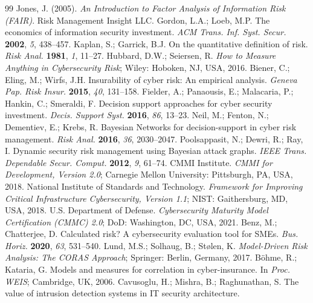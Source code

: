 \documentclass[conference]{IEEEtran}
\begin{document}
\begin{thebibliography}{99}
  Jones, J. (2005).
  \textit{An Introduction to Factor Analysis of Information Risk (FAIR)}.
  Risk Management Insight LLC.
  Gordon, L.A.; Loeb, M.P.
  The economics of information security investment.
  \textit{ACM Trans. Inf. Syst. Secur.} \textbf{2002}, \textit{5}, 438--457.
  Kaplan, S.; Garrick, B.J.
  On the quantitative definition of risk.
  \textit{Risk Anal.} \textbf{1981}, \textit{1}, 11--27.
  Hubbard, D.W.; Seiersen, R.
  \textit{How to Measure Anything in Cybersecurity Risk};
  Wiley: Hoboken, NJ, USA, 2016.
  Biener, C.; Eling, M.; Wirfs, J.H.
  Insurability of cyber risk: An empirical analysis.
  \textit{Geneva Pap. Risk Insur.} \textbf{2015}, \textit{40}, 131--158.
  Fielder, A.; Panaousis, E.; Malacaria, P.; Hankin, C.; Smeraldi, F.
  Decision support approaches for cyber security investment.
  \textit{Decis. Support Syst.} \textbf{2016}, \textit{86}, 13--23.
  Neil, M.; Fenton, N.; Dementiev, E.; Krebs, R.
  Bayesian Networks for decision-support in cyber risk management.
  \textit{Risk Anal.} \textbf{2016}, \textit{36}, 2030--2047.
  Poolsappasit, N.; Dewri, R.; Ray, I.
  Dynamic security risk management using Bayesian attack graphs.
  \textit{IEEE Trans. Dependable Secur. Comput.} \textbf{2012}, \textit{9}, 61--74.
  CMMI Institute.
  \textit{CMMI for Development, Version 2.0};
  Carnegie Mellon University: Pittsburgh, PA, USA, 2018.
  National Institute of Standards and Technology.
  \textit{Framework for Improving Critical Infrastructure Cybersecurity, Version 1.1};
  NIST: Gaithersburg, MD, USA, 2018.
  U.S. Department of Defense.
  \textit{Cybersecurity Maturity Model Certification (CMMC) 2.0};
  DoD: Washington, DC, USA, 2021.
  Benz, M.; Chatterjee, D.
  Calculated risk? A cybersecurity evaluation tool for SMEs.
  \textit{Bus. Horiz.} \textbf{2020}, \textit{63}, 531--540.
  Lund, M.S.; Solhaug, B.; St{\o}len, K.
  \textit{Model-Driven Risk Analysis: The CORAS Approach};
  Springer: Berlin, Germany, 2017.
  B{\"o}hme, R.; Kataria, G.
  Models and measures for correlation in cyber-insurance.
  In \textit{Proc. WEIS}; Cambridge, UK, 2006.
  Cavusoglu, H.; Mishra, B.; Raghunathan, S.
  The value of intrusion detection systems in IT security architecture.

\end{thebibliography}
\end{document}
